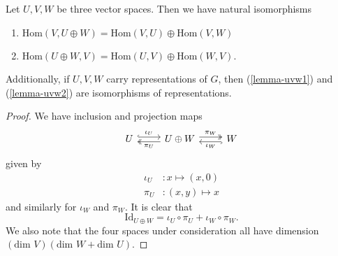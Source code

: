 \begin{lemma}\label{lemma-uvw}
Let $U, V, W$ be three vector spaces.  Then we have natural isomorphisms
\begin{enumerate}
\item \label{lemma-uvw1} $\text{Hom} (V, U \oplus W) = \text{Hom} (V,U) \oplus \text{Hom} (V,W)$
\item \label{lemma-uvw2} $\text{Hom} (U \oplus W, V) = \text{Hom} (U,V) \oplus \text{Hom} (W,V)$.
\end{enumerate}
Additionally, if $U,V,W$ carry representations of $G$, then (\ref{lemma-uvw1}) and (\ref{lemma-uvw2}) are isomorphisms of representations.
\end{lemma}
\begin{proof}
We have inclusion and projection maps
\[
\begin{tikzcd}
U \arrow[r, hookrightarrow,  shift left,"\iota_{U}"]
& U \oplus W \arrow[r, twoheadrightarrow, shift left,"\pi_{W}"]
\arrow[l, twoheadrightarrow, shift left,"\pi_{U}"]
& W
\arrow[l, hookrightarrow, shift left, "\iota_{W}"]
\end{tikzcd}
 \]
 given by
\begin{align*}
 \iota_U &\colon x \mapsto (x , 0) \\
 \pi_U &\colon (x , y) \mapsto x
 \end{align*}
 and similarly for $\iota_W$ and $\pi_W$.  It is clear that
 \[ \text{Id}_{U \oplus W} = \iota_U \circ \pi_U + \iota_W \circ \pi_W. \]
We also note that the four spaces under consideration all have dimension $(\text{dim } V)(\text{dim } W + \text{dim } U)$.


\end{proof}
